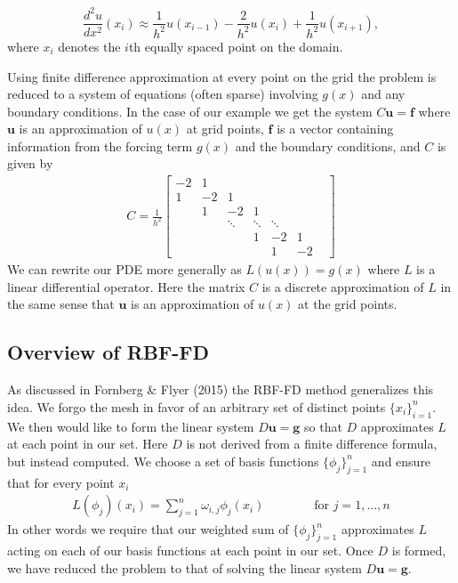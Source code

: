 \documentclass[12pt]{article}
\let\vec\mathbf
\begin{document}
$$
\frac{d^2u}{dx^2}(x_i) \approx \frac{1}{h^2}u(x_{i-1}) - \frac{2}{h^2} u(x_i) + \frac{1}{h^2} u(x_{i+1}),
$$
where $x_i$ denotes the $i$th equally spaced point on the domain.

Using finite difference approximation at every point on the grid the problem is reduced to a system of equations (often sparse) involving $g(x)$ and any boundary conditions. In the case of our example we get the system $C\vec{u} = \vec{f}$ where $\vec{u}$ is an approximation of $u(x)$ at grid points, $\vec{f}$ is a vector containing information from the forcing term $g(x)$ and the boundary conditions, and $C$ is given by
\begin{align*}
C = 
\frac{1}{h^2}\begin{bmatrix}
-2 & 1  &     &   &  &  &\\
1 & -2 &  1  &   &  &  &\\
& 1  &  -2 & 1 &  &  &\\
&    & \ddots & \ddots & \ddots&\\
&    &     & 1 & -2 & 1  \\
&    &     &   &  1 & -2
\end{bmatrix}
\end{align*}
We can rewrite our PDE more generally as $L(u(x))=g(x)$ where $L$ is a linear differential operator. Here the matrix $C$ is a discrete approximation of $L$ in the same sense that $\vec{u}$ is an approximation of $u(x)$ at the grid points.

\subsection{Overview of RBF-FD}	\label{sec_overview_rbffd}
As discussed in Fornberg \& Flyer (2015)\cite{Fornberg2015} the RBF-FD method generalizes this idea. We forgo the mesh in favor of an arbitrary set of distinct points $\{x_i\}_{i=1}^n$. We then would like to form the linear system $D\vec{u} = \vec{g}$ so that $D$ approximates $L$ at each point in our set. Here $D$ is not derived from a finite difference formula, but instead computed. We choose a set of basis functions $\{\phi_j\}_{j=1}^n$ and ensure that for every point $x_i$
\begin{align}
L(\phi_j)(x_i) = \sum\limits_{j=1}^{n} \omega_{i,j} \phi_j(x_i) \phantom{===} \text{for } j=1,...,n \label{row_coef}
\end{align}
In other words we require that our weighted sum of $\{\phi_j\}_{j=1}^n$ approximates $L$ acting on each of our basis functions at each point in our set. Once $D$ is formed, we have reduced the problem to that of solving the linear system $D\vec{u} = \vec{g}$. \bigbreak
\end{document}

